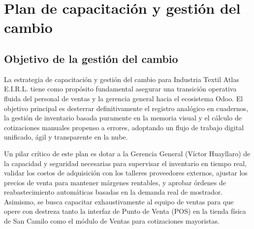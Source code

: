 \section{Plan de capacitación y gestión del cambio}

\subsection{Objetivo de la gestión del cambio}
\begin{indentedsubsection}
La estrategia de capacitación y gestión del cambio para Industria Textil Atlas E.I.R.L. tiene como propósito fundamental asegurar una transición operativa fluida del personal de ventas y la gerencia general hacia el ecosistema Odoo. El objetivo principal es desterrar definitivamente el registro analógico en cuadernos, la gestión de inventario basada puramente en la memoria visual y el cálculo de cotizaciones manuales propenso a errores, adoptando un flujo de trabajo digital unificado, ágil y transparente en la nube.

Un pilar crítico de este plan es dotar a la Gerencia General (Víctor Huayllaro) de la capacidad y seguridad necesarias para supervisar el inventario en tiempo real, validar los costos de adquisición con los talleres proveedores externos, ajustar los precios de venta para mantener márgenes rentables, y aprobar órdenes de reabastecimiento automáticas basadas en la demanda real de mostrador. Asimismo, se busca capacitar exhaustivamente al equipo de ventas para que opere con destreza tanto la interfaz de Punto de Venta (POS) en la tienda física de San Camilo como el módulo de Ventas para cotizaciones mayoristas.
\end{indentedsubsection}

